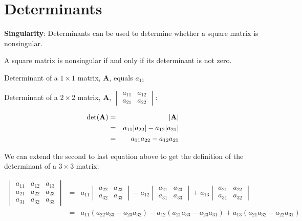 \documentclass[
]{book}
\theoremstyle{definition}
\theoremstyle{definition}
\theoremstyle{definition}
\theoremstyle{remark}
\begin{document}
\hypertarget{determinants}{%
\section{Determinants}\label{determinants}}

\textbf{Singularity}: Determinants can be used to determine whether a square matrix is nonsingular.

A square matrix is nonsingular if and only if its determinant is not zero.

Determinant of a \(1 \times 1\) matrix, \textbf{A}, equals \(a_{11}\)

Determinant of a \(2 \times 2\) matrix, \textbf{A},
\(\begin{vmatrix} a_{11}&a_{12}\\  a_{21}&a_{22} \end{vmatrix}\):

\begin{eqnarray*}
\det({\bf A}) &=& |{\bf A}|\\
            &=& a_{11}|a_{22}| - a_{12}|a_{21}|\\
            &=& a_{11}a_{22} - a_{12}a_{21}
\end{eqnarray*}

We can extend the second to last equation above to get the definition of the determinant of a \(3 \times 3\) matrix:

\begin{eqnarray*}
            \begin{vmatrix} a_{11}&a_{12}&a_{13}\\  a_{21} & a_{22}&a_{23}\\ a_{31}&a_{32}&a_{33} \end{vmatrix} 
                &=& 
                a_{11} \begin{vmatrix} a_{22}&a_{23}\\ a_{32}&a_{33} \end{vmatrix}
                - a_{12} \begin{vmatrix} a_{21}&a_{23}\\ a_{31}&a_{33} \end{vmatrix}
                + a_{13} \begin{vmatrix} a_{21}&a_{22}\\ a_{31}&a_{32} 
                \end{vmatrix}\\
                &=& a_{11}(a_{22}a_{33} - a_{23}a_{32}) - a_{12}(a_{21}a_{33} - a_{23}a_{31}) + a_{13}(a_{21}a_{32} - a_{22}a_{31})
\end{eqnarray*}
\end{document}
